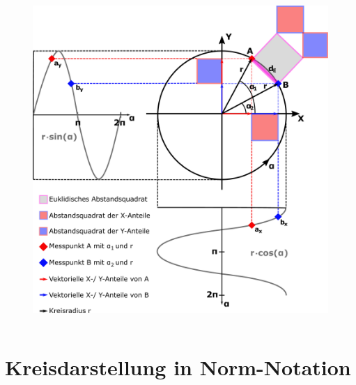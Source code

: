 \documentclass{beamer}
\begin{document}
\begin{frame}
\begin{columns}[c]
\begin{figure}
\begin{overprint}
			\includegraphics[width=\linewidth]{images/Kreisdarstellung_Winkelabstand}
		\end{overprint}
	\end{figure}
\end{columns}
\end{frame}
\section{Kreisdarstellung in Norm-Notation}
\end{document}
